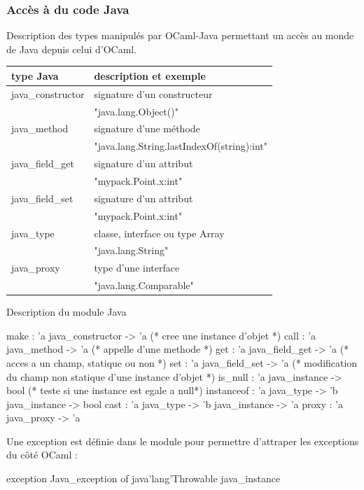 \documentclass[a4paper, 11pt, notitlepage]{article}
\begin{document}
\subsubsection{Accès à du code Java}
\noindent
Description des types manipulés par OCaml-Java permettant un accès au
monde de Java depuis celui d'OCaml.  

\begin{tabular}{|l|l|}
  \hline
  type Java & description et exemple \\
  \hline
  java\_constructor & signature d'un constructeur  \\
  &  "java.lang.Object()" \\
  \hline
  java\_method & signature d'une méthode \\
  & "java.lang.String.lastIndexOf(string):int"\\
  \hline
  java\_field\_get & signature d'un attribut\\
  & "mypack.Point.x:int" \\
  \hline
  java\_field\_set & signature d'un attribut\\
  & "mypack.Point.x:int" \\
  \hline
  java\_type & classe, interface ou type Array\\
  & "java.lang.String"\\
  \hline
  java\_proxy & type d'une interface\\
  & "java.lang.Comparable"\\ 
  \hline
\end{tabular}

\noindent
Description du module Java

\begin{OCamlEx}
make : 'a java_constructor -> 'a (* cree une instance d'objet *)
call : 'a java_method -> 'a (* appelle d'une methode *)
get : 'a java_field_get -> 'a (* acces a un champ, statique ou non *)
set : 'a java_field_set -> 'a (* modification du champ non statique
d'une instance d'objet *)
is_null : 'a java_instance -> bool (* teste si une instance est egale a null*)
instanceof : 'a java_type -> 'b java_instance -> bool
cast : 'a java_type -> 'b java_instance -> 'a
proxy : 'a java_proxy -> 'a
\end{OCamlEx}
Une exception est définie dans le module pour permettre d'attraper les
exceptions du côté OCaml :
\begin{OCamlEx}
exception Java_exception of java'lang'Throwable java_instance
\end{OCamlEx}
\end{document}
